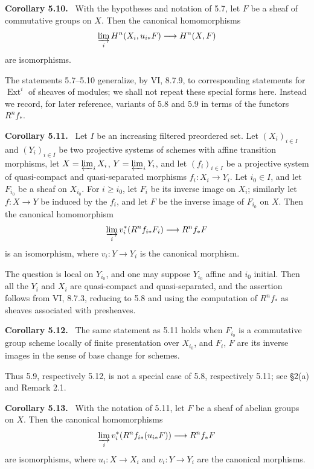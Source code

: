 \documentclass[11pt]{article}
\newcommand{\Ext}{\operatorname{Ext}}
\newenvironment{statement}[1]{\par\medskip\noindent\textbf{#1.}\ }{\par\medskip}
\begin{document}
\begin{statement}{Corollary 5.10}
With the hypotheses and notation of 5.7, let \(F\) be a sheaf of commutative groups on \(X\). Then the canonical homomorphisms
\[
\varinjlim_i H^n(X_i,u_{i*}F)\longrightarrow H^n(X,F)
\]
are isomorphisms.
\end{statement}

The statements 5.7--5.10 generalize, by VI, 8.7.9, to corresponding statements for \(\Ext^i\) of sheaves of modules; we shall not repeat these special forms here. Instead we record, for later reference, variants of 5.8 and 5.9 in terms of the functors \(R^nf_*\).

\begin{statement}{Corollary 5.11}
Let \(I\) be an increasing filtered preordered set. Let \((X_i)_{i\in I}\) and \((Y_i)_{i\in I}\) be two projective systems of schemes with affine transition morphisms, let \(X=\varprojlim_iX_i\), \(Y=\varprojlim_iY_i\), and let \((f_i)_{i\in I}\) be a projective system of quasi-compact and quasi-separated morphisms \(f_i:X_i\to Y_i\). Let \(i_0\in I\), and let \(F_{i_0}\) be a sheaf on \(X_{i_0}\). For \(i\ge i_0\), let \(F_i\) be its inverse image on \(X_i\); similarly let \(f:X\to Y\) be induced by the \(f_i\), and let \(F\) be the inverse image of \(F_{i_0}\) on \(X\). Then the canonical homomorphism
\[
\varinjlim_i v_i^*(R^nf_{i*}F_i)\longrightarrow R^nf_*F
\]
is an isomorphism, where \(v_i:Y\to Y_i\) is the canonical morphism.
\end{statement}

The question is local on \(Y_{i_0}\), and one may suppose \(Y_{i_0}\) affine and \(i_0\) initial. Then all the \(Y_i\) and \(X_i\) are quasi-compact and quasi-separated, and the assertion follows from VI, 8.7.3, reducing to 5.8 and using the computation of \(R^nf_*\) as sheaves associated with presheaves.

\begin{statement}{Corollary 5.12}
The same statement as 5.11 holds when \(F_{i_0}\) is a commutative group scheme locally of finite presentation over \(X_{i_0}\), and \(F_i\), \(F\) are its inverse images in the sense of base change for schemes.
\end{statement}

Thus 5.9, respectively 5.12, is not a special case of 5.8, respectively 5.11; see §2(a) and Remark 2.1.

\begin{statement}{Corollary 5.13}
With the notation of 5.11, let \(F\) be a sheaf of abelian groups on \(X\). Then the canonical homomorphisms
\[
\varinjlim_i v_i^*(R^nf_{i*}(u_{i*}F))\longrightarrow R^nf_*F
\]
are isomorphisms, where \(u_i:X\to X_i\) and \(v_i:Y\to Y_i\) are the canonical morphisms.
\end{statement}
\end{document}
